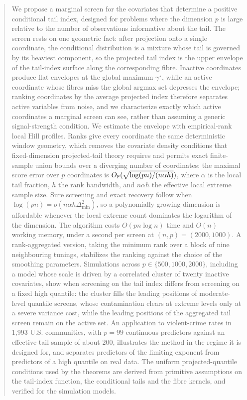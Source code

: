 \documentclass[bj,authoryear]{imsart}
\theoremstyle{plain}
\newcommand{\gmax}{\gamma^\star}
\begin{document}
\begin{frontmatter}
\begin{abstract}
We propose a marginal screen for the covariates that determine a positive
conditional tail index, designed for problems where the dimension $p$ is large
relative to the number of observations informative about the tail. The screen
rests on one geometric fact: after projection onto a single coordinate, the
conditional distribution is a mixture whose tail is governed by its heaviest
component, so the projected tail index is the upper envelope of the tail-index
surface along the corresponding fibre. Inactive coordinates produce flat
envelopes at the global maximum $\gmax$, while an active coordinate whose
fibres miss the global argmax set depresses the envelope; ranking coordinates
by the average projected index therefore separates active variables from
noise, and we characterize exactly which active coordinates a marginal screen
can see, rather than assuming a generic signal-strength condition. We estimate
the envelope with empirical-rank local Hill profiles. Ranks give every
coordinate the same deterministic window geometry, which removes the covariate
density conditions that fixed-dimension projected-tail theory requires and
permits exact finite-sample union bounds over a diverging number of
coordinates: the maximal score error over $p$ coordinates is
$O_{\Pp}(\sqrt{\log(pn)/(n\alpha h)})$, where $\alpha$ is the local tail
fraction, $h$ the rank bandwidth, and $n\alpha h$ the effective local extreme
sample size. Sure screening and exact recovery follow when
$\log(pn)=o(n\alpha h\Delta_{\min}^2)$, so a polynomially growing dimension is
affordable whenever the local extreme count dominates the logarithm of the
dimension. The algorithm costs $O(pn\log n)$ time and $O(n)$ working memory,
under a second per screen at $(n,p)=(2000,1000)$. A rank-aggregated version,
taking the minimum rank over a block of nine neighbouring tunings, stabilizes
the ranking against the choice of the smoothing parameters. Simulations across
$p\in\{500,1000,2000\}$, including a model whose scale is driven by a
correlated cluster of twenty inactive covariates, show when screening on
the tail index differs from screening on a fixed high quantile: the
cluster fills the leading positions of moderate-level quantile screens,
whose contamination clears at extreme levels only at a severe variance
cost, while the leading positions of the aggregated tail screen remain
on the active set. An application to violent-crime rates in 1{,}993
U.S. communities, with $p=99$ continuous predictors against an
effective tail sample of about $200$, illustrates the method in the
regime it is designed for, and separates predictors of the limiting
exponent from predictors of a high quantile on real data. The uniform
projected-quantile conditions used by the theorems are derived from
primitive assumptions on the tail-index function, the conditional tails
and the fibre kernels, and verified for the simulation models.
\end{abstract}


\end{frontmatter}
\end{document}
